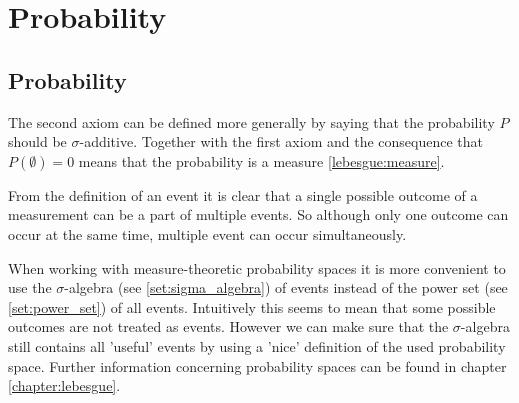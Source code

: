 \chapter{Probability}\label{chapter:probability}   

\section{Probability}

	\begin{remark}
    		The second axiom can be defined more generally by saying that the probability $P$ should be $\sigma$-additive. Together with the first axiom and the consequence that $P(\emptyset) = 0$ means that the probability is a measure \ref{lebesgue:measure}.
	\end{remark}
    

	
	\begin{remark*}
		From the definition of an event it is clear that a single possible outcome of a measurement can be a part of multiple events. So although only one outcome can occur at the same time, multiple event can occur simultaneously.
	\end{remark*}
	\begin{remark*}
		When working with measure-theoretic probability spaces it is more convenient to use the $\sigma$-algebra (see \ref{set:sigma_algebra}) of events instead of the power set (see \ref{set:power_set}) of all events. Intuitively this seems to mean that some possible outcomes are not treated as events. However we can make sure that the $\sigma$-algebra still contains all 'useful' events by using a 'nice' definition of the used probability space. Further information concerning probability spaces can be found in chapter \ref{chapter:lebesgue}.
	\end{remark*}
    
